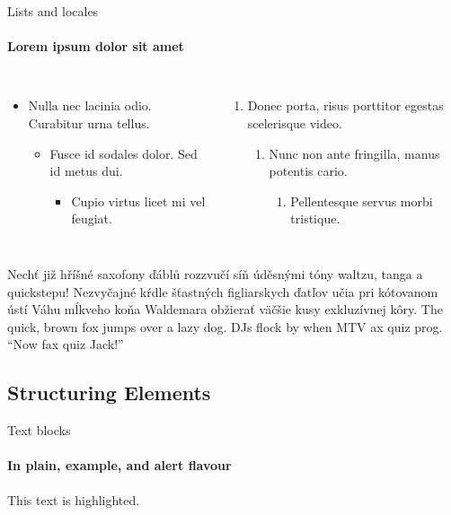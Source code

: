 \documentclass{beamer}
\begin{document}
\begin{darkframes}
  \begin{frame}[label=lists]{Lists and locales}
    \framesubtitle{Lorem ipsum dolor sit amet}
    \begin{columns}[onlytextwidth]
      \begin{itemize}
        \item Nulla nec lacinia odio. Curabitur urna tellus.
              \begin{itemize}
                \item Fusce id sodales dolor. Sed id metus dui.
                      \begin{itemize}
                        \item Cupio virtus licet mi vel feugiat.
                      \end{itemize}
              \end{itemize}
      \end{itemize}
      \begin{enumerate}
        \item Donec porta, risus porttitor egestas scelerisque video.
              \begin{enumerate}
                \item Nunc non ante fringilla, manus potentis cario.
                      \begin{enumerate}
                        \item Pellentesque servus morbi tristique.
                      \end{enumerate}
              \end{enumerate}
      \end{enumerate}
    \end{columns}
    \bigskip
    \justifying

    {Nechť již hříšné saxofony ďáblů
      rozzvučí síň úděsnými tóny waltzu, tanga a quickstepu!}
    { Nezvyčajné kŕdle šťastných figliarskych
      ďatľov učia pri kótovanom ústí Váhu mĺkveho koňa Waldemara
      obžierať väč\-šie kusy exkluzívnej kôry.}
    {The quick, brown fox jumps over a lazy
      dog. DJs flock by when MTV ax quiz prog. “Now fax quiz Jack!”}
  \end{frame}

  \subsection{Structuring Elements}
  \begin{frame}[label=simmonshall]{Text blocks}
    \framesubtitle{In plain, example, and \alert{alert} flavour}
    \alert{This text} is highlighted.


\end{frame}
\end{darkframes}
\end{document}
